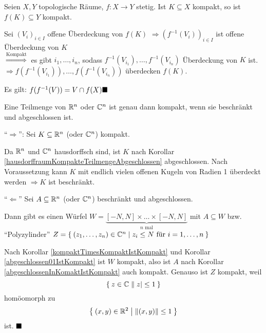 \begin{korollar}
    Seien $X, Y$ topologische Räume, $f: X \rightarrow Y$ stetig.
    Ist $K \subseteq X$ kompakt, so ist $f(K) \subseteq Y$ kompakt.
\end{korollar}

\begin{beweis}
    Sei $(V_i)_{i \in I}$ offene Überdeckung von $f(K)$
    $\Rightarrow (f^{-1}(V_i))_{i \in I}$ ist offene Überdeckung von $K$\\
    $\stackrel{\text{Kompakt}}{\Rightarrow}$ es gibt $i_1, \dots, i_n$, 
    sodass $f^{-1}(V_{i_1}), \dots, f^{-1}(V_{i_n})$ Überdeckung von
    $K$ ist.\\
    $\Rightarrow f(f^{-1}( V_{i_1})), \dots, f(f^{-1}(V_{i_n}))$ 
    überdecken $f(K)$.

    Es gilt: $f(f^{-1}(V)) = V \cap f(X) \qed$
\end{beweis}

\begin{korollar}
    Eine Teilmenge von $\mathbb{R}^n$ oder $\mathbb{C}^n$ ist genau dann kompakt,
    wenn sie beschränkt und abgeschlossen ist.
\end{korollar}

\begin{beweis}
    \enquote{$\Rightarrow$}: Sei $K \subseteq \mathbb{R}^n$ (oder $\mathbb{C}^n$)
    kompakt.

    Da $\mathbb{R}^n$ und $\mathbb{C}^n$ hausdorffsch sind, ist $K$ nach Korollar
    \ref{hausdorffraumKompakteTeilmengeAbgeschlossen} abgeschlossen.
    Nach Voraussetzung kann $K$ mit endlich vielen offenen Kugeln von 
    Radien 1 überdeckt werden $\Rightarrow K$ ist beschränkt.

    \enquote{$\Leftarrow$} Sei $A \subseteq \mathbb{R}^n$ (oder $\mathbb{C}^n$)
    beschränkt und abgeschlossen.

    Dann gibt es einen Würfel $W = \underbrace{[-N, N] \times \dots \times [-N, N]}_{n \text{ mal}}$
    mit $A \subseteq W$ bzw. \enquote{Polyzylinder}
    $Z = \Set{(z_1, \dots, z_n) \in \ensuremath{\mathbb{C}}^n | z_i \leq N \text{ für } i= 1, \dots, n}$

    Nach Korollar \ref{kompaktTimesKompaktIstKompakt} und Korollar
    \ref{abgeschlossen01IstKompakt} ist $W$ kompakt, also ist $A$
    nach Korollar \ref{abgeschlossenInKomaktIstKompakt} auch kompakt.
    Genauso ist $Z$ kompakt, weil 
    \[\Set{z \in \ensuremath{\mathbb{C}}| |z| \leq 1}\]
    homöomorph zu
    \[\Set{(x,y) \in \ensuremath{\mathbb{R}}^2 | \|(x,y)\| \leq 1}\]
    ist. $\qed$
\end{beweis}


